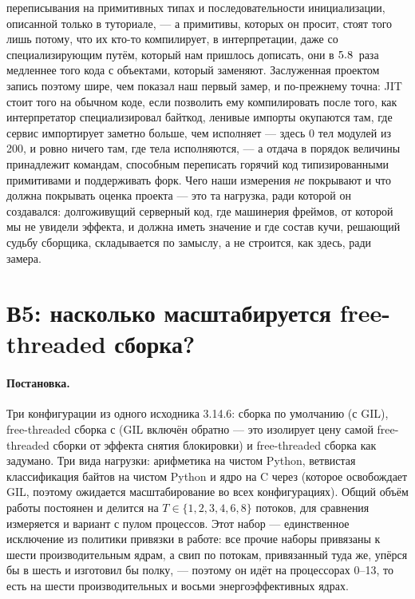 переписывания на примитивных типах и последовательности инициализации, описанной только в
туториале, --- а
примитивы, которых он просит, стоят того лишь потому, что их кто-то компилирует, в интерпретации,
даже со специализирующим путём, который нам пришлось дописать, они в $\meas{ratio:b6_static-fork_static_adaptive:matmul96_int/fork_static_adaptive/static_interp|b6_static-fork_static_adaptive:matmul96_int/fork_static_adaptive/boxed_python}{5.8}$~раза медленнее того кода
с объектами, который заменяют. Заслуженная проектом запись поэтому шире, чем показал наш первый
замер, и по-прежнему точна: JIT стоит того на обычном коде, если позволить ему компилировать после
того, как интерпретатор специализировал байткод, ленивые импорты окупаются там, где сервис
импортирует заметно больше, чем исполняет --- здесь 0 тел модулей из 200, и ровно ничего там, где
тела исполняются, --- а отдача в порядок величины принадлежит командам, способным переписать
горячий код типизированными примитивами и поддерживать форк. Чего наши измерения \emph{не} покрывают и что должна покрывать оценка
проекта --- это та нагрузка, ради которой он создавался: долгоживущий серверный код, где машинерия
фреймов, от которой мы не увидели эффекта, и должна иметь значение и где состав кучи, решающий
судьбу сборщика, складывается по замыслу, а не строится, как здесь, ради замера.

\section{В5: насколько масштабируется free-threaded сборка?}
\label{sec:rq5}


\paragraph{Постановка.} Три конфигурации из одного исходника 3.14.6: сборка по умолчанию (с GIL),
free-threaded сборка с  (GIL включён обратно --- это изолирует цену самой
free-threaded сборки от эффекта снятия блокировки) и free-threaded сборка как задумано. Три вида
нагрузки: арифметика на чистом Python, ветвистая классификация байтов на чистом Python и ядро на C
через  (которое освобождает GIL, поэтому ожидается масштабирование во всех
конфигурациях). Общий объём работы постоянен и делится на $T \in \{1,2,3,4,6,8\}$ потоков, для
сравнения измеряется и вариант с пулом процессов. Этот набор --- единственное исключение из
политики привязки в работе: все прочие наборы привязаны к шести производительным ядрам, а свип по
потокам, привязанный туда же, упёрся бы в шесть и изготовил бы полку, --- поэтому он идёт на
процессорах 0--13, то есть на шести производительных и восьми энергоэффективных ядрах.

